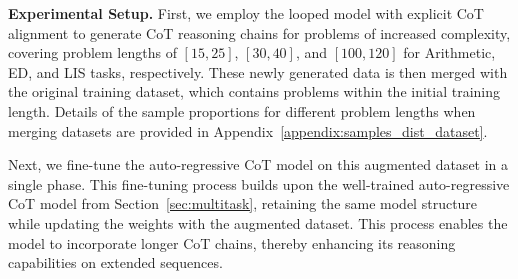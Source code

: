 \textbf{Experimental Setup. }
First, we employ the looped model with explicit CoT alignment to generate CoT reasoning chains for problems of increased complexity, covering problem lengths of $[15, 25]$, $[30, 40]$, and $[100, 120]$ for Arithmetic, ED, and LIS tasks, respectively. These newly generated data is then merged with the original training dataset, which contains problems within the initial training length. Details of the sample proportions for different problem lengths when merging datasets are provided in Appendix~\ref{appendix:samples_dist_dataset}.

Next, we fine-tune the auto-regressive CoT model on this augmented dataset in a single phase. This fine-tuning process builds upon the well-trained auto-regressive CoT model from Section~\ref{sec:multitask}, retaining the same model structure
while updating the weights with the augmented dataset. This process enables the model to incorporate longer CoT chains, thereby enhancing its reasoning capabilities on extended sequences.


